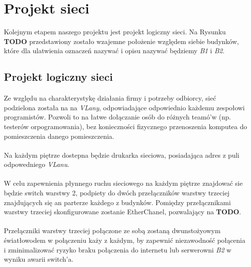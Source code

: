 \newpage
\section{Projekt sieci}
\paragraph{}
Kolejnym etapem naszego projektu jest projekt logiczny sieci. Na Rysunku \textbf{TODO} przedstawiony zostało wzajemne położenie względem siebie budynków, które dla ulatwienia oznaczeń nazywać i opisu nazywać będziemy \textit{B1} i \textit{B2}. 

\subsection{Projekt logiczny sieci}
\paragraph{}
Ze względu na charakterystykę działania firmy i potrzeby odbiorcy, sieć podzielona została na na \textit{VLany}, odpowiadające odpowiednio każdemu zespołowi programistów. Pozwoli to na łatwe dołączanie osób do różnych teamó'w (np. testerów orpogramowania), bez konieczności fizycznego przenoszenia komputea do pomieszczenia danego pomieszczenia.

\paragraph{}
Na każdym piętrze dostepna będzie drukarka sieciowa, posiadająca adres z puli odpowedniego \textit{VLanu}.

\paragraph{}
W celu zapewnienia płynnego ruchu sieciowego na każdym piętrze znajdować sie będzie switch warstwy 2, podpiety do dwóch przełączników warstwy trzeciej znajdujących się an parterze każdego z budynków. Pomiędzy przełącznikami warstwy trzeciej skonfigurowane zostanie EtherChanel, pozwalający na \textbf{TODO}. 

\paragraph{} 
Przełączniki warstwy trzeciej połączone ze sobą zostaną dwunstożyowym światłowodem w połączeniu każy z każdym, by zapewnić niezawodność połącenia i zminimalizować ryzyko braku połączenia do internetu lub serwerowni \textit{B2} w wyniku awarii switch'a.

